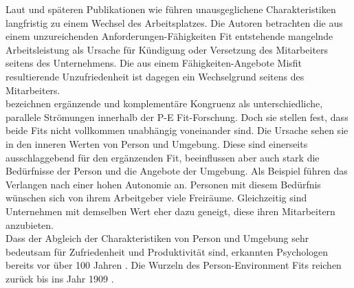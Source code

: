 Laut \textcite[S. 9ff.]{workAdjustment:1964} und späteren Publikationen wie \textcite{wanous:1992} führen unausgeglichene Charakteristiken langfristig zu einem Wechsel des Arbeitsplatzes. Die Autoren betrachten die aus einem unzureichenden Anforderungen-Fähigkeiten Fit entstehende mangelnde Arbeitsleistung als Ursache für Kündigung oder Versetzung des Mitarbeiters seitens des Unternehmens. Die aus einem Fähigkeiten-Angebote Misfit resultierende Unzufriedenheit ist dagegen ein Wechselgrund seitens des Mitarbeiters.\\
\textcite[S. 1ff.]{edwards:2004} bezeichnen ergänzende und komplementäre Kongruenz als unterschiedliche, parallele Strömungen innerhalb der P-E Fit-Forschung. Doch sie stellen fest, dass beide Fits nicht vollkommen unabhängig voneinander sind. Die Ursache sehen sie in den inneren Werten von Person und Umgebung. Diese sind einerseits ausschlaggebend für den ergänzenden Fit, beeinflussen aber auch stark die Bedürfnisse der Person und die Angebote der Umgebung. Als Beispiel führen \textcite[S. 3]{edwards:2004} das Verlangen nach einer hohen Autonomie an. Personen mit diesem Bedürfnis wünschen sich von ihrem Arbeitgeber viele Freiräume. Gleichzeitig sind Unternehmen mit demselben Wert eher dazu geneigt, diese ihren Mitarbeitern anzubieten.\\
Dass der Abgleich der Charakteristiken von Person und Umgebung sehr bedeutsam für Zufriedenheit und Produktivität sind, erkannten Psychologen bereits vor über 100 Jahren \cite[S. 5ff.]{parsons:1909}. Die Wurzeln des Person-Environment Fits reichen zurück bis ins Jahr 1909 \cite[S. 1]{su:2015}.

